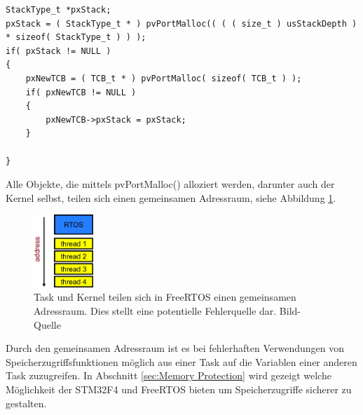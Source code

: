 \begin{lstlisting}[caption={FreeRTOS Source von xTaskCreate() aus Task.c. Jede Task besitzt einen Stack und einen Task Control Block, beide werden beim Aufruf von xTaskCreate (Zeile 5 und Zeile 11) erstellt.}, linewidth=8cm,captionpos=b, label=lst:xTaskCreate, float=htb]
StackType_t *pxStack;
pxStack = ( StackType_t * ) pvPortMalloc(( ( ( size_t ) usStackDepth ) 
* sizeof( StackType_t ) ) );
if( pxStack != NULL )
{
	pxNewTCB = ( TCB_t * ) pvPortMalloc( sizeof( TCB_t ) );
	if( pxNewTCB != NULL )
	{
		pxNewTCB->pxStack = pxStack;
	}

}
\end{lstlisting}
Alle Objekte, die mittels pvPortMalloc() alloziert werden, darunter auch der Kernel selbst, teilen sich einen gemeinsamen Adressraum, siehe Abbildung \ref{fig:AddressSpace}. 
\begin{figure}[hbt]
	\centering
		\includegraphics[width=0.2\textwidth]{Pictures/EmbeddedCom/addressSpace.jpg}
	\caption{Task und Kernel teilen sich in FreeRTOS einen gemeinsamen Adressraum. Dies stellt eine potentielle Fehlerquelle dar. Bild-Quelle~\protect{}}
	\label{fig:AddressSpace}
\end{figure} 
Durch den gemeinsamen Adressraum ist es bei fehlerhaften Verwendungen von Speicherzugriffsfunktionen möglich aus einer Task auf die Variablen einer anderen Task zuzugreifen. 
\newline
In Abschnitt \ref{sec:Memory Protection} wird gezeigt welche Möglichkeit der STM32F4 und FreeRTOS bieten um Speicherzugriffe sicherer zu gestalten.    
\pagebreak 
